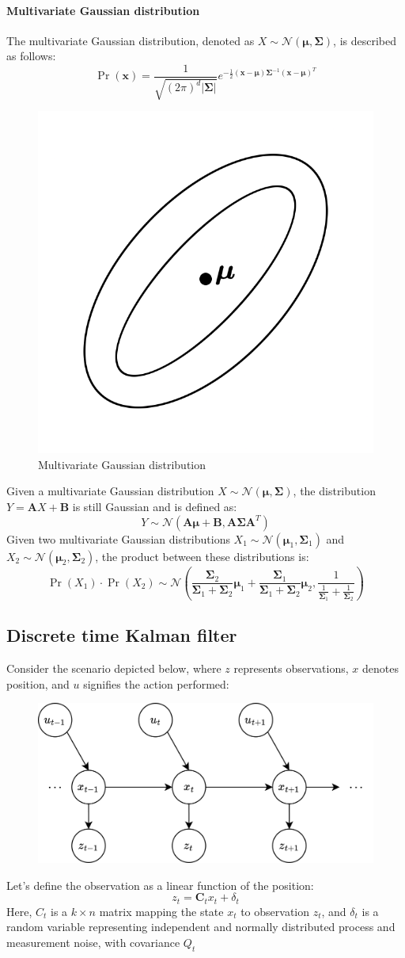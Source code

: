 \paragraph*{Multivariate Gaussian distribution}
The multivariate Gaussian distribution, denoted as $X\sim \mathcal{N}(\boldsymbol{\mu},\mathbf{\Sigma})$, is described as follows:
\[\Pr(\mathbf{x})=\dfrac{1}{\sqrt{(2\pi)^d\left\lvert \mathbf{\Sigma} \right\rvert }}e^{-\frac{1}{2}(\mathbf{x}-\boldsymbol{\mu})\mathbf{\Sigma}^{-1}(\mathbf{x}-\boldsymbol{\mu})^T}\]
\begin{figure}[H]
    \centering
    \includegraphics[width=0.35\linewidth]{images/mgd.png}
    \caption{Multivariate Gaussian distribution}
\end{figure}
Given a multivariate Gaussian distribution $X\sim \mathcal{N}(\boldsymbol{\mu},\mathbf{\Sigma})$, the distribution $Y=\mathbf{A}X+\mathbf{B}$ is still Gaussian and is defined as:
\[Y\sim \mathcal{N}(\mathbf{A\mu}+\mathbf{B},\mathbf{A\Sigma A}^T)\]
Given two multivariate Gaussian distributions $X_1\sim\mathcal{N}(\boldsymbol{\mu}_1,\mathbf{\Sigma}_1)$ and $X_2\sim\mathcal{N}(\boldsymbol{\mu}_2,\mathbf{\Sigma}_2)$, the product between these distributions is:
\[\Pr(X_1)\cdot\Pr(X_2)\sim\mathcal{N}\left(\dfrac{\mathbf{\Sigma}_2}{\mathbf{\Sigma}_1+\mathbf{\Sigma}_2}\boldsymbol{\mu}_1+\dfrac{\mathbf{\Sigma}_1}{\mathbf{\Sigma}_1+\mathbf{\Sigma}_2}\boldsymbol{\mu}_2,\dfrac{1}{\frac{1}{\mathbf{\Sigma}_1}+\frac{1}{\mathbf{\Sigma}_2}}\right)\]

\subsection{Discrete time Kalman filter}
Consider the scenario depicted below, where $z$ represents observations, $x$ denotes position, and $u$ signifies the action performed:
\begin{figure}[H]
    \centering
    \includegraphics[width=0.75\linewidth]{images/kal.png}
\end{figure}
Let's define the observation as a linear function of the position:
\[z_t=\mathbf{C}_tx_t+\delta_t\]
Here, $C_t$ is a $k\times n$ matrix mapping the state $x_t$ to observation $z_t$, and $\delta_t$ is a random variable representing independent and normally distributed process and measurement noise, with covariance $Q_t$

